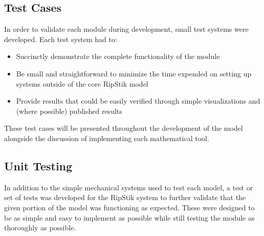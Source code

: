 \subsection{Test Cases}
In order to validate each module during development, small test systems were developed. Each test system had to:
\begin{itemize}
\item Succinctly demonstrate the complete functionality of the module 
\item Be small and straightforward to minimize the time expended on setting up systems outside of the core RipStik model
\item Provide results that could be easily verified through simple visualizations and (where possible) published results
\end{itemize}
These test cases will be presented throughout the development of the model alongside the discussion of implementing each mathematical tool.
\subsection{Unit Testing}
In addition to the simple mechanical systems used to test each model, a test or set of tests was developed for the RipStik system to further validate that the given portion of the model was functioning as expected. These were designed to be as simple and easy to implement as possible while still testing the module as thoroughly as possible.
